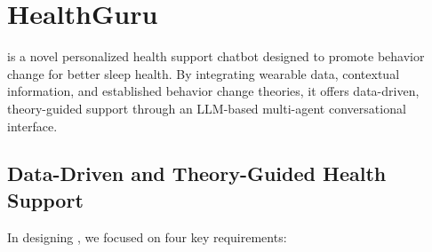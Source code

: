 \section{HealthGuru}\label{sec.bg}
\name{} is a novel personalized health support chatbot designed to promote behavior change for better sleep health. By integrating wearable data, contextual information, and established behavior change theories, it offers data-driven, theory-guided support through an LLM-based multi-agent conversational interface.


\subsection{Data-Driven and Theory-Guided Health Support}

In designing \name{}, we focused on four key requirements:

